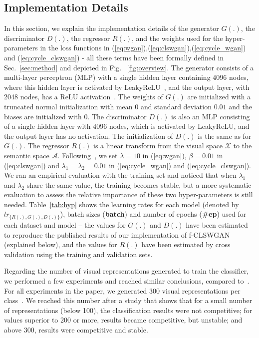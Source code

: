 \documentclass[runningheads]{llncs}
\begin{document}
\subsection{Implementation Details}

In this section, we explain the implementation details of the generator $G(.)$, the discriminator $D(.)$, the regressor $R(.)$, and the weights used for the hyper-parameters in the loss functions in (\ref{eq:wgan}),(\ref{eq:clswgan}),(\ref{eq:cycle_wgan}) and (\ref{eq:cycle_clswgan}) - all these terms have been formally defined in Sec.~\ref{sec:method} and depicted in Fig. ~\ref{fig:overview}.
The generator consists of a multi-layer perceptron (MLP) with a single hidden layer containing 4096 nodes, where this hidden layer is activated by LeakyReLU~\cite{maas2013relu}, and the output layer, with 2048 nodes, has a ReLU activation~\cite{nair2010rectified}.
The weights of $G(.)$ are initialized with a truncated normal initialization with mean 0 and standard deviation $0.01$ and the biases are initialized with $0$. 
The discriminator $D(.)$ is also an MLP consisting of a single hidden layer with 4096 nodes, which is activated by LeakyReLU, and the output layer has no activation.  The initialization of $D(.)$ is the same as for $G(.)$.  
The regressor $R(.)$ is a linear transform from the visual space $\mathcal{X}$ to the semantic space $\mathcal{A}$.
Following~\cite{XianCVPR2018}, we set $\lambda=10$ in (\ref{eq:wgan}), $\beta = 0.01$ in (\ref{eq:clswgan}) and $\lambda_1 = \lambda_2 = 0.01$ in (\ref{eq:cycle_wgan}) and (\ref{eq:cycle_clswgan}). We ran an empirical evaluation with the training set and noticed that when $\lambda_1$ and $\lambda_2$ share the same value, the training becomes stable, but a more systematic evaluation to assess the relative importance of these two hyper-parameters is still needed. Table~\ref{tab:hyp} shows the learning rates for each model (denoted by $lr_{\{ R(.), G(.), D(.)  \}}$), batch sizes (\textbf{batch}) and number of epochs (\textbf{\#ep}) used for each dataset and model -- the values for $G(.)$ and $D(.)$ have been estimated to reproduce the published results of our implementation of f-CLSWGAN (explained below), and the values for $R(.)$ have been estimated by cross validation using the training and validation sets.

Regarding the number of visual representations generated to train the classifier, we performed a few experiments and reached similar conclusions, compared to~\cite{XianCVPR2018}. For all experiments in the paper, we generated 300 visual representations per class~\cite{XianCVPR2018}. We reached this number after a study that shows that for a small number of representations (below 100), the classification results were not competitive; for values superior to 200 or more, results became competitive, but unstable; and above 300, results were competitive and stable.
\end{document}
